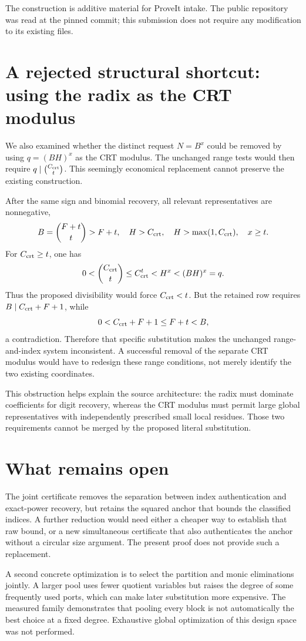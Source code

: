 \documentclass[11pt]{article}
\theoremstyle{definition}\newtheorem{definition}[theorem]{Definition}
\begin{document}
The construction is additive material for ProveIt intake. The public
repository was read at the pinned commit; this submission does not
require any modification to its existing files.

\section{A rejected structural shortcut: using the radix as the CRT modulus}
\label{sec:obstruction}

We also examined whether the distinct request $N=B^x$ could be removed by
using $q=(BH)^x$ as the CRT modulus. The unchanged range tests would then
require $q\mid\binom{C_{\rm crt}}{t}$. This seemingly economical
replacement cannot preserve the existing construction.

After the same sign and binomial recovery, all relevant representatives
are nonnegative,
\[
 B=\binom{F+t}{t}>F+t,\quad
 H>C_{\rm crt},\quad H>\max(1,C_{\rm crt}),\quad x\ge t.
\]
For $C_{\rm crt}\ge t$, one has
\[
 0<\binom{C_{\rm crt}}t
 \le C_{\rm crt}^t<H^x<(BH)^x=q.
\]
Thus the proposed divisibility would force $C_{\rm crt}<t$.
But the retained row requires $B\mid C_{\rm crt}+F+1$, while
\[
 0<C_{\rm crt}+F+1\le F+t<B,
\]
a contradiction. Therefore that specific substitution makes the
unchanged range-and-index system inconsistent. A successful removal of
the separate CRT modulus would have to redesign these range conditions,
not merely identify the two existing coordinates.

This obstruction helps explain the source architecture: the radix must
dominate coefficients for digit recovery, whereas the CRT modulus must
permit large global representatives with independently prescribed
small local residues. Those two requirements cannot be merged by the
proposed literal substitution.

\section{What remains open}

The joint certificate removes the separation between index authentication
and exact-power recovery, but retains the squared anchor that bounds
the classified indices. A further reduction would need either a cheaper
way to establish that raw bound, or a new simultaneous certificate that
also authenticates the anchor without a circular size argument. The
present proof does not provide such a replacement.

A second concrete optimization is to select the partition and monic
eliminations jointly. A larger pool uses fewer quotient variables but
raises the degree of some frequently used ports, which can make later
substitution more expensive. The measured family demonstrates that
pooling every block is not automatically the best choice at a fixed
degree. Exhaustive global optimization of this design space was not
performed.
\end{document}
